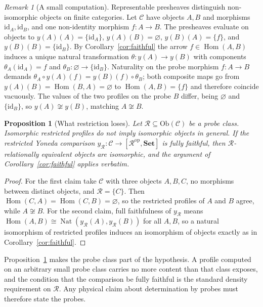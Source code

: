 \documentclass[11pt,letterpaper]{article}
\DeclareMathOperator{\Hom}{Hom}
\DeclareMathOperator{\Nat}{Nat}
\newtheorem{proposition}[theorem]{Proposition}
\theoremstyle{definition}
\theoremstyle{remark}
\newtheorem{remark}[theorem]{Remark}
\begin{document}
\begin{remark}[A small computation]
\label{ex:small}
Representable presheaves distinguish non-isomorphic objects on finite categories. Let $\mathcal{C}$ have objects $A, B$ and morphisms $\mathrm{id}_A, \mathrm{id}_B$, and one non-identity morphism $f \colon A \to B$. The presheaves evaluate on objects to $y(A)(A) = \{\mathrm{id}_A\}$, $y(A)(B) = \varnothing$, $y(B)(A) = \{f\}$, and $y(B)(B) = \{\mathrm{id}_B\}$. By Corollary~\ref{cor:faithful} the arrow $f \in \Hom(A, B)$ induces a unique natural transformation $\theta \colon y(A) \to y(B)$ with components $\theta_A(\mathrm{id}_A) = f$ and $\theta_B \colon \varnothing \to \{\mathrm{id}_B\}$. Naturality on the probe morphism $f \colon A \to B$ demands $\theta_A \circ y(A)(f) = y(B)(f) \circ \theta_B$; both composite maps go from $y(A)(B) = \Hom(B, A) = \varnothing$ to $\Hom(A, B) = \{f\}$ and therefore coincide vacuously. The values of the two profiles on the probe $B$ differ, being $\varnothing$ and $\{\mathrm{id}_B\}$, so $y(A) \not\cong y(B)$, matching $A \not\cong B$.
\end{remark}

\begin{proposition}[What restriction loses]
\label{prop:restriction}
Let $\mathcal{R} \subseteq \mathrm{Ob}(\mathcal{C})$ be a probe class. Isomorphic restricted profiles do not imply isomorphic objects in general. If the restricted Yoneda comparison $y_{\mathcal{R}} \colon \mathcal{C} \to [\mathcal{R}^{\mathrm{op}}, \mathbf{Set}]$ is fully faithful, then $\mathcal{R}$-relationally equivalent objects are isomorphic, and the argument of Corollary~\ref{cor:faithful} applies verbatim.
\end{proposition}

\begin{proof}
For the first claim take $\mathcal{C}$ with three objects $A, B, C$, no morphisms between distinct objects, and $\mathcal{R} = \{C\}$. Then $\Hom(C, A) = \Hom(C, B) = \varnothing$, so the restricted profiles of $A$ and $B$ agree, while $A \not\cong B$. For the second claim, full faithfulness of $y_{\mathcal{R}}$ means $\Hom(A, B) \cong \Nat(y_{\mathcal{R}}(A), y_{\mathcal{R}}(B))$ for all $A, B$, so a natural isomorphism of restricted profiles induces an isomorphism of objects exactly as in Corollary~\ref{cor:faithful}.
\end{proof}

Proposition~\ref{prop:restriction} makes the probe class part of the hypothesis. A profile computed on an arbitrary small probe class carries no more content than that class exposes, and the condition that the comparison be fully faithful is the standard density requirement on $\mathcal{R}$. Any physical claim about determination by probes must therefore state the probes.
\end{document}
